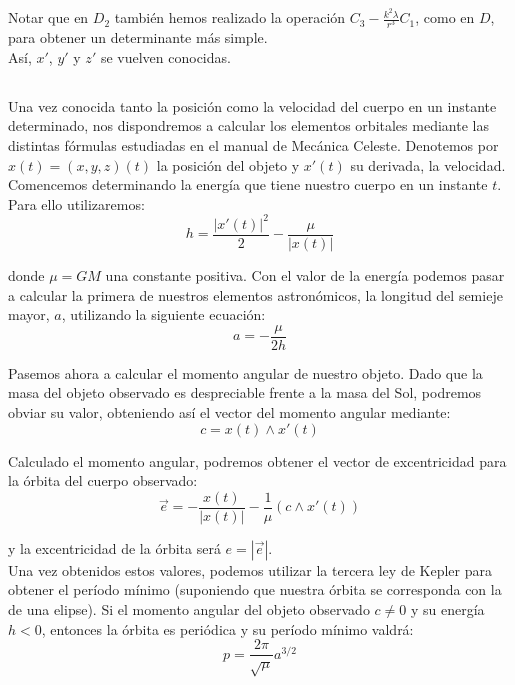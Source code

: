 \documentclass[11pt]{article}
\begin{document}
Notar que en $D_2$ también hemos realizado la operación $C_3-\frac{k^2\lambda}{r^3}C_1$, como en $D$, para obtener un determinante más simple.\\

Así, $x'$, $y'$ y $z'$ se vuelven conocidas.\\

\subsection{}
\label{subsec:elements_determination}
Una vez conocida tanto la posición como la velocidad del cuerpo en un instante determinado, nos dispondremos a calcular los elementos orbitales mediante las distintas fórmulas estudiadas en el manual de Mecánica Celeste\cite{ortega}. Denotemos por $x(t)=(x,y,z)(t)$ la posición del objeto y $x'(t)$ su derivada, la velocidad.\\

Comencemos determinando la energía que tiene nuestro cuerpo en un instante $t$. Para ello utilizaremos:
\[
h=\frac{|x'(t)|^2}{2}-\frac{\mu}{|x(t)|}
\]

\noindent donde $\mu=GM$ una constante positiva. Con el valor de la energía podemos pasar a calcular la primera de nuestros elementos astronómicos, la longitud del semieje mayor, $a$, utilizando la siguiente ecuación:
\[
a=-\frac{\mu}{2h}
\]

Pasemos ahora a calcular el momento angular de nuestro objeto. Dado que la masa del objeto observado es despreciable frente a la masa del Sol, podremos obviar su valor, obteniendo así el vector del momento angular mediante:
\[
c=x(t)\wedge x'(t)
\]

Calculado el momento angular, podremos obtener el vector de excentricidad para la órbita del cuerpo observado:
\[
\vec{e}=-\frac{x(t)}{|x(t)|}-\frac{1}{\mu}(c\wedge x'(t))
\]

\noindent y la excentricidad de la órbita será $e=|\vec{e}|$.\\

Una vez obtenidos estos valores, podemos utilizar la tercera ley de Kepler para obtener el período mínimo (suponiendo que nuestra órbita se corresponda con la de una elipse). Si el momento angular del objeto observado $c\neq0$ y su energía $h<0$, entonces la órbita es periódica y su período mínimo valdrá:
\[
p=\frac{2\pi}{\sqrt{\mu}}a^{3/2}
\]
\end{document}
